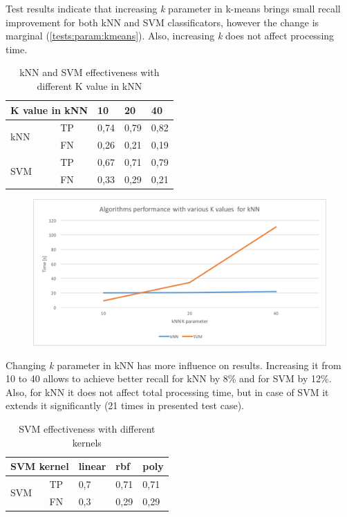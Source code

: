 Test results indicate that increasing \textit{k} parameter in k-means brings small recall improvement for both kNN and SVM classificators, however the change is marginal (\ref{tests:param:kmeans}). Also, increasing \textit{k} does not affect processing time.

\begin{table}[H]
	\centering
	\caption{kNN and SVM effectiveness with different K value in kNN}
	\label{tests:param:knn}
	\begin{tabular}{@{}lllll@{}}
		\toprule
		\multicolumn{2}{l}{K value in kNN} & 10   & 20   & 40   \\ \midrule
		\multirow{2}{*}{kNN}      & TP      & 0,74 & 0,79 & 0,82 \\
		& FN      & 0,26 & 0,21 & 0,19 \\
		\multirow{2}{*}{SVM}      & TP      & 0,67 & 0,71 & 0,79 \\
		& FN      & 0,33 & 0,29 & 0,21 \\ \bottomrule
	\end{tabular}
\end{table}

\begin{figure}[H]
	\begin{center}
		\includegraphics[width=0.9\linewidth]{images/tests/param-knn.png}
		\caption{ }
		\label{param-knn}
	\end{center}
\end{figure}

Changing \textit{k} parameter in kNN has more influence on results. Increasing it from 10 to 40 allows to achieve better recall for kNN by 8\% and for SVM by 12\%. Also, for kNN it does not affect total processing time, but in case of SVM it extends it significantly (21 times in presented test case).

\begin{table}[H]
	\centering
	\caption{SVM effectiveness with different kernels}
	\label{tests:param:svm}
	\begin{tabular}{@{}lllll@{}}
		\toprule
		\multicolumn{2}{l}{SVM kernel} & linear & rbf  & poly \\ \midrule
		\multirow{2}{*}{SVM}    & TP   & 0,7    & 0,71 & 0,71 \\
		& FN   & 0,3    & 0,29 & 0,29 \\ \bottomrule
	\end{tabular}
\end{table}

